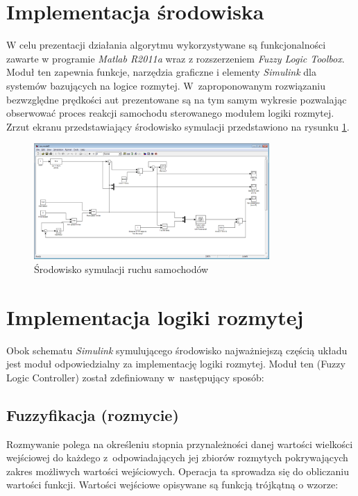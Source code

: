 \documentclass[11pt,a4paper]{article}
\begin{document}
\section{Implementacja środowiska}
W celu prezentacji działania algorytmu wykorzystywane są funkcjonalności zawarte w programie \emph{Matlab R2011a} wraz z rozszerzeniem \emph{Fuzzy Logic Toolbox}. Moduł ten zapewnia funkcje, narzędzia graficzne i elementy \emph{Simulink} dla systemów bazujących na logice rozmytej. W~zaproponowanym rozwiązaniu bezwzględne prędkości aut prezentowane są na tym samym wykresie pozwalając obserwować proces reakcji samochodu sterowanego modułem logiki rozmytej. Zrzut ekranu przedstawiający środowisko symulacji przedstawiono na rysunku \ref{img:simulink}.

\begin{figure}
\centering 
\includegraphics[width=0.8\textwidth]{simulink.png}
\caption{Środowisko symulacji ruchu samochodów} 
\label{img:simulink}
\end{figure}

\section{Implementacja logiki rozmytej}
Obok schematu \emph{Simulink} symulującego środowisko najważniejszą częścią układu jest moduł odpowiedzialny za implementację logiki rozmytej. Moduł ten (Fuzzy Logic Controller) został zdefiniowany w~następujący sposób:

\subsection{Fuzzyfikacja (rozmycie)}
Rozmywanie polega na określeniu stopnia przynależności danej wartości wielkości wejściowej do każdego z~odpowiadających jej zbiorów rozmytych pokrywających zakres możliwych wartości wejściowych. Operacja ta sprowadza się do obliczaniu wartości funkcji. Wartości wejściowe opisywane są funkcją trójkątną o wzorze:
\end{document}
